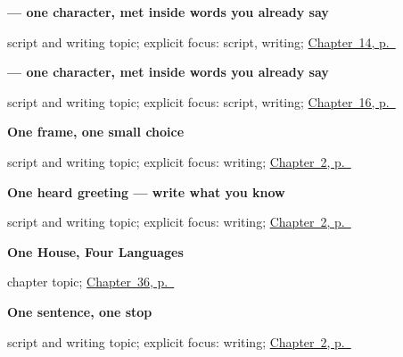 \noindent\begin{minipage}[t]{\linewidth}
\raggedright
\textbf{ — one character, met inside words you already say}\par
\footnotesize script and writing topic; explicit focus: script, writing; \hyperref[ch:hi-seasons]{Chapter~14, p.~\pageref*{ch:hi-seasons}}
\end{minipage}\par\smallskip

\noindent\begin{minipage}[t]{\linewidth}
\raggedright
\textbf{ — one character, met inside words you already say}\par
\footnotesize script and writing topic; explicit focus: script, writing; \hyperref[ch:hi-months]{Chapter~16, p.~\pageref*{ch:hi-months}}
\end{minipage}\par\smallskip

\noindent\begin{minipage}[t]{\linewidth}
\raggedright
\textbf{One frame, one small choice}\par
\footnotesize script and writing topic; explicit focus: writing; \hyperref[ch:introductions]{Chapter~2, p.~\pageref*{ch:introductions}}
\end{minipage}\par\smallskip

\noindent\begin{minipage}[t]{\linewidth}
\raggedright
\textbf{One heard greeting — write what you know}\par
\footnotesize script and writing topic; explicit focus: writing; \hyperref[ch:introductions]{Chapter~2, p.~\pageref*{ch:introductions}}
\end{minipage}\par\smallskip

\noindent\begin{minipage}[t]{\linewidth}
\raggedright
\textbf{One House, Four Languages}\par
\footnotesize chapter topic; \hyperref[ch:hi-one-house-four-languages]{Chapter~36, p.~\pageref*{ch:hi-one-house-four-languages}}
\end{minipage}\par\smallskip

\noindent\begin{minipage}[t]{\linewidth}
\raggedright
\textbf{One sentence, one stop}\par
\footnotesize script and writing topic; explicit focus: writing; \hyperref[ch:introductions]{Chapter~2, p.~\pageref*{ch:introductions}}
\end{minipage}\par\smallskip

